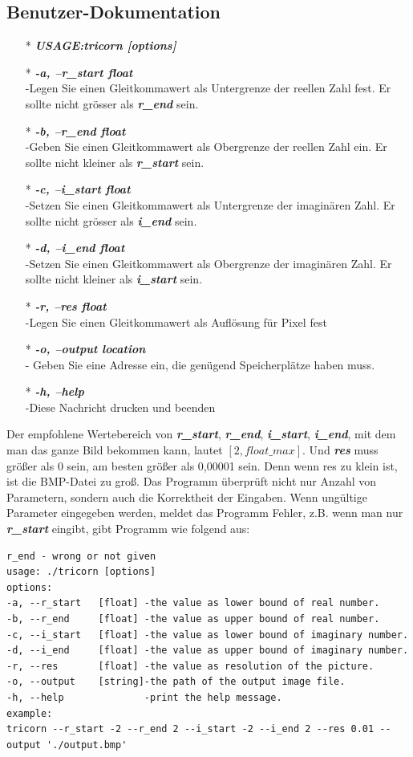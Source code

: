 \documentclass[course=erap]{aspdoc}
\begin{document}
\subsection{Benutzer-Dokumentation}
\begin{itemize}
\item[*]\textbf{\emph{USAGE:tricorn [options]}}
\item[*]\textbf{\emph{-a, --r\_start  float}}
\\-Legen Sie einen Gleitkommawert als Untergrenze der reellen Zahl fest. Er sollte nicht grösser als \emph{\textbf{r\_end}} sein.
\item[*]\textbf{\emph{-b, --r\_end float}}
\\-Geben Sie einen Gleitkommawert als Obergrenze der reellen Zahl ein. Er sollte nicht kleiner als \emph{\textbf{r\_start}} sein.
\item[*]\textbf{\emph{-c, --i\_start  float}}
\\-Setzen Sie einen Gleitkommawert als Untergrenze der imaginären Zahl. Er sollte nicht grösser als \emph{\textbf{i\_end}} sein.
\item[*]\textbf{\emph{-d, --i\_end  float}}
\\-Setzen Sie einen Gleitkommawert als Obergrenze der imaginären Zahl. Er sollte nicht kleiner als \emph{\textbf{i\_start}} sein.
\item[*]\textbf{\emph{-r, --res  float}}
\\-Legen Sie einen Gleitkommawert als Auflösung für Pixel fest
\item[*]\textbf{\emph{-o, --output  location}}
\\- Geben Sie eine Adresse ein, die genügend Speicherplätze haben muss.
\item[*]\textbf{\emph{-h, --help}}
\\-Diese Nachricht drucken und beenden
\end{itemize}
Der empfohlene Wertebereich von \textbf{\emph{r\_start}}, \textbf{\emph{r\_end}}, \textbf{\emph{i\_start}}, \textbf{\emph{i\_end}}, mit dem man das ganze Bild bekommen kann, lautet $[2,float\_max]$. Und \textbf{\emph{res}} muss größer als 0 sein, am besten größer als 0,00001 sein. Denn wenn res zu klein ist, ist die BMP-Datei zu groß. Das Programm überprüft nicht nur Anzahl von Parametern, sondern auch die Korrektheit der Eingaben. Wenn ungültige Parameter eingegeben werden, meldet das Programm Fehler, z.B. wenn man nur \emph{\textbf{r\_start}} eingibt, gibt Programm wie folgend aus:
\begin{lstlisting}
r_end - wrong or not given
usage: ./tricorn [options]
options:
-a, --r_start   [float] -the value as lower bound of real number.
-b, --r_end     [float] -the value as upper bound of real number.
-c, --i_start   [float] -the value as lower bound of imaginary number.
-d, --i_end     [float] -the value as upper bound of imaginary number.
-r, --res       [float] -the value as resolution of the picture.
-o, --output    [string]-the path of the output image file.
-h, --help              -print the help message.
example:
tricorn --r_start -2 --r_end 2 --i_start -2 --i_end 2 --res 0.01 --output './output.bmp'
\end{lstlisting}
\end{document}
